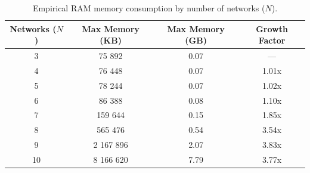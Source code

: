 \begin{table}[htbp]
\centering
\caption{Empirical RAM memory consumption by number of networks ($N$).}
\label{tab:memory_consumption}
\begin{tabular}{cccc}
\hline
\textbf{Networks ($N$)} & \textbf{Max Memory (KB)} & \textbf{Max Memory (GB)} & \textbf{Growth Factor} \\ \hline
3 & 75 892 & 0.07 & --- \\
4 & 76 448 & 0.07 & 1.01x \\
5 & 78 244 & 0.07 & 1.02x \\
6 & 86 388 & 0.08 & 1.10x \\
7 & 159 644 & 0.15 & 1.85x \\
8 & 565 476 & 0.54 & 3.54x \\
9 & 2 167 896 & 2.07 & 3.83x \\
10 & 8 166 620 & 7.79 & 3.77x \\
\hline
\end{tabular}
\end{table}